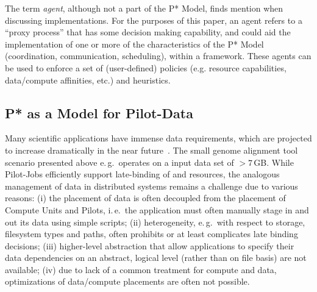 \documentclass[conference]{IEEEtran}
\begin{document}
The term {\it agent}, although not a part of the P* Model, finds
mention when discussing implementations. For the purposes of this
paper, an agent refers to a ``proxy process'' 
that has some decision making capability, and could aid the
implementation of one or more of the characteristics of the P* Model
(coordination, communication, scheduling), within a \pilotjob
framework.  These agents can be used to enforce a set of
(user-defined) policies (e.g.  resource capabilities, data/compute
affinities, etc.) and heuristics.




\subsection{P* as a Model for Pilot-Data}
\label{sec:pilot-data}




Many scientific applications have immense data requirements, which are
projected to increase dramatically in the near
future~\cite{hey2009}. The small genome alignment tool
scenario presented above
e.\,g.\ operates on a input data set of
$>7$\,GB. While Pilot-Jobs efficiently support late-binding of
\I{\computeunits} and resources, the analogous management of data in distributed
systems remains a challenge due to various reasons: (i) the placement
of data is often decoupled from the placement of Compute Units and
Pilots, i.\,e.\ the application must often manually stage in and out
its data using simple scripts;  (ii) heterogeneity, e.\,g.\ with
respect to storage, filesystem types and paths, often prohibits or at
least complicates late binding decisions; (iii) higher-level
abstraction that allow applications to specify their data dependencies
on an abstract, logical level (rather than on file basis) are not
available; (iv) due to lack of a common treatment for compute and
data, optimizations of data/compute placements are often not
possible. 
\end{document}
